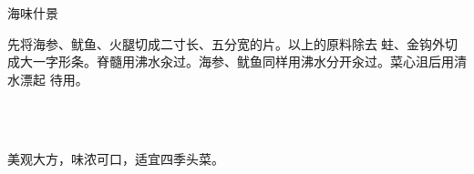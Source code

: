 \begin{recipe}{海味什景}

\ingredients


\preparation

\step 先将海参、鱿鱼、火腿切成二寸长、五分宽的片。以上的原料除去𧎼蛀、金钩外切
成大一字形条。脊髓用沸水汆过。海参、鱿鱼同样用沸水分开汆过。菜心沮后用清水漂起
待用。

\step 𧎼蛀放在蒸碗内上笼大火蒸粑，将锅放在旺火上，放下猪油，再放入姜葱，爆出香
味后，倒入鸡汤、盐、糖汁、料酒、酱油、花椒、胡椒及以上用沸水汆过的原材料（除鱿
鱼、海参、脊髓、小菜外小火烧圯。再将小菜沮把后，在白油锅内煸过，起锅垫入走菜盘
内。再将烧圯后的一字条，捞入盘内放在小菜上边。鱿鱼、脊髓，放在烧一字条等原料的
原汁 内，烧上味打入盘内放在一字条块上边。再放入海参于原汁 内烧上味，勾入豆粉，
起锅淋入盘内，海参放在鱿鱼、脊髓上面上席。

\features

美观大方，味浓可口，适宜四季头菜。

\end{recipe}

